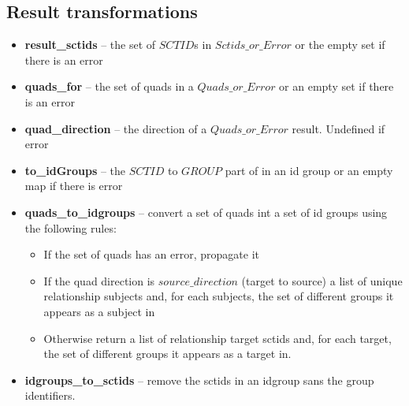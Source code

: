 \documentclass{article}
\begin{document}
\subsection{Result transformations}
\begin{itemize}[noitemsep,nolistsep]
\item \textbf{result\_sctids} -- the set of $SCTID$s in $Sctids\_or\_Error$ or the empty set if there is an error
\item \textbf{quads\_for} -- the set of quads in a $Quads\_or\_Error$ or an empty set if there is an error
\item \textbf{quad\_direction} -- the direction of a $Quads\_or\_Error$ result.  Undefined if error
\item \textbf{to\_idGroups} -- the $SCTID$ to $GROUP$ part of in an id group or an empty map if there is error
\item \textbf{quads\_to\_idgroups} -- convert a set of quads int a set of id groups using the following rules:
\begin{itemize}[noitemsep,nolistsep]
\item If the set of quads has an error, propagate it
\item If the quad direction is $source\_direction$ (target to source) a list of unique relationship subjects and, for each subjects, the set of different groups it appears as a subject in
\item Otherwise return a list of relationship target sctids and, for each target, the set of different groups it appears as a target in.
\end{itemize}
\item \textbf{idgroups\_to\_sctids} -- remove the sctids in an idgroup sans the group identifiers.
\end{itemize}
\end{document}
